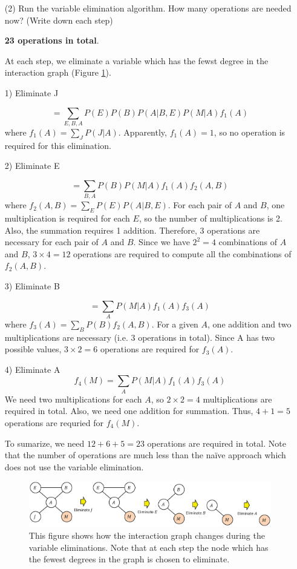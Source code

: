 \begin{enumerate}
\begin{enumerate}
\item[(2)] Run the variable elimination algorithm. How many operations are needed now? (Write down each step)

{\bf 23 operations in total}.

At each step, we eliminate a variable which has the fewst degree in the interaction graph (Figure \ref{fig:interaction_graph}).

1) Eliminate J

\[
=\sum_{E,B,A} P(E)P(B)P(A|B,E)P(M|A)f_1(A)
\]
where $f_1 (A)=\sum_J P(J|A)$. Apparently, $f_1 (A)=1$, so no operation is required for this elimination.

2) Eliminate E

\[
=\sum_{B,A} P(B)P(M|A) f_1 (A) f_2 (A,B)
\]
where $f_2 (A,B)=\sum_E P(E)P(A|B,E)$. For each pair of $A$ and $B$, one multiplication is required for each $E$, so the number of multiplications is 2. Also, the summation requires 1 addition. Therefore, 3 operations are necessary for each pair of $A$ and $B$. Since we have $2^2=4$ combinations of $A$ and $B$, $3 \times 4 = 12$ operations are required to compute all the combinations of $f_2 (A,B)$.

3) Eliminate B

\[
=\sum_{A} P(M|A) f_1 (A) f_3 (A)
\]
where $f_3 (A)=\sum_B P(B)f_2 (A,B)$. For a given $A$, one addition and two multiplications are necessary (i.e. 3 operations in total). Since A has two possible values, $3 \times 2 = 6$ operations are required for $f_3 (A)$.

4) Eliminate A
\[
f_4 (M)=\sum_{A} P(M|A) f_1 (A) f_3 (A)
\]
We need two multiplications for each $A$, so $2 \times 2 = 4$ multiplications are required in total. Also, we need one addition for summation. Thus, $4 + 1 = 5$ operations are requried for $f_4 (M)$. 

To sumarize, we need $12 + 6 + 5 = 23$ operations are required in total. Note that the number of operations are much less than the na\"ive approach which does not use the variable elimination.

\begin{figure}[hbtp]
\centering
\includegraphics[width=160mm]{interaction_graph}
\caption{This figure shows how the interaction graph changes during the variable eliminations. Note that at each step the node which has the fewest degrees in the graph is chosen to eliminate.}
\label{fig:interaction_graph}
\end{figure}

\end{enumerate}


\end{enumerate}



